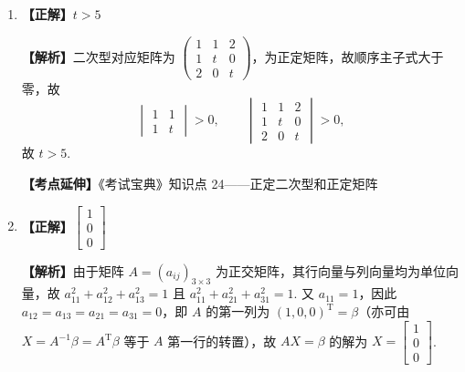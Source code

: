 \documentclass[a4paper,11pt]{ctexart}
\newcommand{\T}{\mathrm{T}}
\begin{document}
\begin{enumerate}[label=\arabic*., leftmargin=2em, itemsep=0.75em, topsep=0.5em]
  \textbf{【解析】}$B = (\alpha_1, \alpha_2, \alpha_3) \begin{pmatrix} 1 & 1 & 1 \\ 1 & 2 & 3 \\ 1 & 4 & 9 \end{pmatrix}$，故 $|B| = |A| \begin{vmatrix} 1 & 1 & 1 \\ 1 & 2 & 3 \\ 1 & 4 & 9 \end{vmatrix} = 1 \times 2 = 2$.

  \textbf{【考点延伸】}《考试宝典》知识点 4——矩阵的概念和基本运算

  \item \textbf{【正解】}$t > 5$

  \textbf{【解析】}二次型对应矩阵为 $\begin{pmatrix} 1 & 1 & 2 \\ 1 & t & 0 \\ 2 & 0 & t \end{pmatrix}$，为正定矩阵，故顺序主子式大于零，故
  \[
    \begin{vmatrix} 1 & 1 \\ 1 & t \end{vmatrix} > 0,\qquad
    \begin{vmatrix} 1 & 1 & 2 \\ 1 & t & 0 \\ 2 & 0 & t \end{vmatrix} > 0,
  \]
  故 $t > 5$.

  \textbf{【考点延伸】}《考试宝典》知识点 24——正定二次型和正定矩阵

  \item \textbf{【正解】}$\begin{bmatrix} 1 \\ 0 \\ 0 \end{bmatrix}$

  \textbf{【解析】}由于矩阵 $A = (a_{ij})_{3 \times 3}$ 为正交矩阵，其行向量与列向量均为单位向量，故 $a_{11}^2 + a_{12}^2 + a_{13}^2 = 1$ 且 $a_{11}^2 + a_{21}^2 + a_{31}^2 = 1$. 又 $a_{11} = 1$，因此 $a_{12} = a_{13} = a_{21} = a_{31} = 0$，即 $A$ 的第一列为 $(1, 0, 0)^{\T} = \beta$（亦可由 $X = A^{-1}\beta = A^{\T}\beta$ 等于 $A$ 第一行的转置），故 $AX = \beta$ 的解为 $X = \begin{bmatrix} 1 \\ 0 \\ 0 \end{bmatrix}$.
\end{enumerate}
\end{document}
